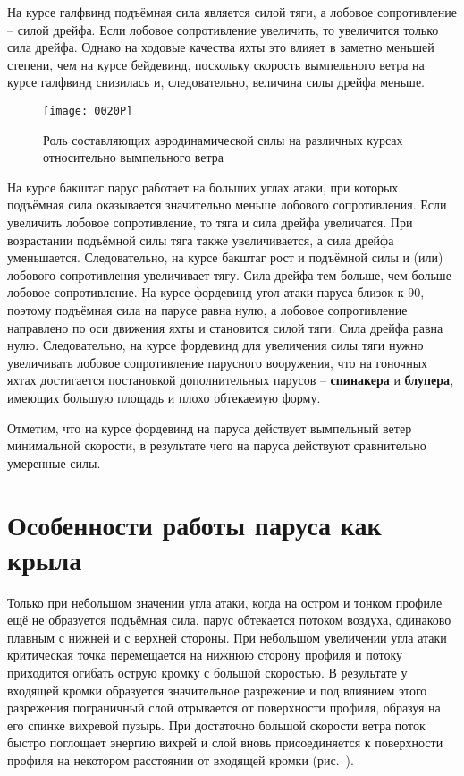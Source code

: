 На курсе галфвинд подъёмная сила является силой тяги, а лобовое
сопротивление \--- силой дрейфа. Если лобовое сопротивление увеличить,
то увеличится только сила дрейфа. Однако на ходовые качества яхты это
влияет в заметно меньшей степени, чем на курсе бейдевинд, поскольку
скорость вымпельного ветра на курсе галфвинд снизилась и,
следовательно, величина силы дрейфа меньше.

\begin{figure*}[htb]
  \centering
  \texttt{[image: 0020P]}
  \caption{Роль составляющих аэродинамической силы на различных курсах относительно вымпельного ветра}
  \label{fig:20}
\end{figure*}

На курсе бакштаг парус работает на больших углах атаки, при которых
подъёмная сила оказывается значительно меньше лобового
сопротивления. Если увеличить лобовое сопротивление, то тяга и сила
дрейфа увеличатся. При возрастании подъёмной силы тяга также
увеличивается, а сила дрейфа уменьшается. Следовательно, на курсе
бакштаг рост и подъёмной силы и (или) лобового сопротивления
увеличивает тягу. Сила дрейфа тем больше, чем больше лобовое
сопротивление. На курсе фордевинд угол атаки паруса близок к 90\gr,
поэтому подъёмная сила на парусе равна нулю, а лобовое сопротивление
направлено по оси движения яхты и становится силой тяги. Сила дрейфа
равна нулю. Следовательно, на курсе фордевинд для увеличения силы тяги
нужно увеличивать лобовое сопротивление парусного вооружения, что на
гоночных яхтах достигается постановкой дополнительных парусов \---
\textbf{спинакера} и \textbf{блупера}, имеющих большую площадь и плохо
обтекаемую форму.

Отметим, что на курсе фордевинд на паруса действует вымпельный ветер
минимальной скорости, в результате чего на паруса действуют
сравнительно умеренные силы.

\section{Особенности работы паруса как крыла}

Только при небольшом значении угла атаки, когда на остром и тонком
профиле ещё не образуется подъёмная сила, парус обтекается потоком
воздуха, одинаково плавным с нижней и с верхней стороны. При небольшом
увеличении угла атаки критическая точка перемещается на нижнюю сторону
профиля и потоку приходится огибать острую кромку с большой
скоростью. В результате у входящей кромки образуется значительное
разрежение и под влиянием этого разрежения пограничный слой отрывается
от поверхности профиля, образуя на его спинке вихревой пузырь. При
достаточно большой скорости ветра поток быстро поглощает энергию
вихрей и слой вновь присоединяется к поверхности профиля на некотором
расстоянии от входящей кромки (рис.~).

